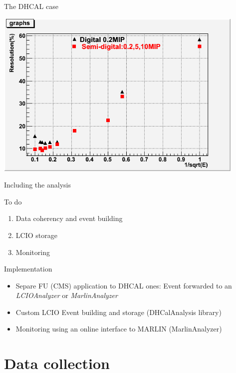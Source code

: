 \documentclass[10pt]{beamer}
\begin{document}
\begin{frame}{The DHCAL case}
 \centerline{\includegraphics[width=0.9\textwidth]{images/DigitalSemiDigital}}
\end{frame}

\begin{frame}{Including the analysis}

\begin{block}{ To do}
  \begin{enumerate}
    \item Data coherency and event building
    \item LCIO storage
    \item Monitoring
  \end{enumerate}
\end{block}
\pause 
\begin{block}{ Implementation}
  \begin{itemize}
    \item Separe FU (CMS) application to DHCAL ones: Event forwarded to an {\sl LCIOAnalyzer } or {\sl MarlinAnalyzer}
    \item Custom LCIO Event building and storage (DHCalAnalysis library)
    \item Monitoring using an online interface to MARLIN (MarlinAnalyzer)
  \end{itemize}
\end{block}

\end{frame}

\section{Data collection}
\end{document}

